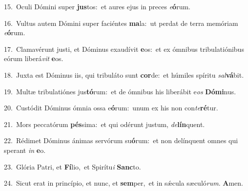 {\numbfont\textcolor{\numbcolor}{15.}}~Oculi Dómini super \textbf{jus}\-tos:~\star et aures ejus in preces \textit{e}\-\textbf{ó}rum.\par
{\numbfont\textcolor{\numbcolor}{16.}}~Vultus autem Dómini super faciéntes \textbf{ma}\-la:~\star ut perdat de terra memóriam \textit{e}\-\textbf{ó}rum.\par
{\numbfont\textcolor{\numbcolor}{17.}}~Clamavérunt justi, et Dóminus exaudívit \textbf{e}\-os:~\star et ex ómnibus tribulatiónibus eórum liberá\textit{vit} \textbf{e}\-os.\par
{\numbfont\textcolor{\numbcolor}{18.}}~Juxta est Dóminus iis, qui tribuláto sunt \textbf{cor}\-de:~\star et húmiles spíritu \textit{sal}\-\textbf{vá}bit.\par
{\numbfont\textcolor{\numbcolor}{19.}}~Multæ tribulatiónes jus\-\textbf{tó}\-rum:~\star et de ómnibus his liberábit e\textit{os} \textbf{Dó}\-\textbf{mi}nus.\par
{\numbfont\textcolor{\numbcolor}{20.}}~Custódit Dóminus ómnia ossa e\-\textbf{ó}\-rum:~\star unum ex his non con\-\textit{te}\-\textbf{ré}tur.\par
{\numbfont\textcolor{\numbcolor}{21.}}~Mors peccatórum \textbf{pés}\-sima:~\star et qui odérunt justum, \textit{de}\-\textbf{lín}quent.\par
{\numbfont\textcolor{\numbcolor}{22.}}~Rédimet Dóminus ánimas servórum su\-\textbf{ó}\-rum:~\star et non delínquent omnes qui sperant \textit{in} \textbf{e}\-o.\par
{\numbfont\textcolor{\numbcolor}{23.}}~Glória Patri, et \textbf{Fí}\-lio,~\star et Spirítu\textit{i} \textbf{Sanc}\-to.\par
{\numbfont\textcolor{\numbcolor}{24.}}~Sicut erat in princípio, et nunc, et \textbf{sem}\-per,~\star et in sǽcula sæculó\-\textit{rum}\-. \textbf{A}\-men.\par
